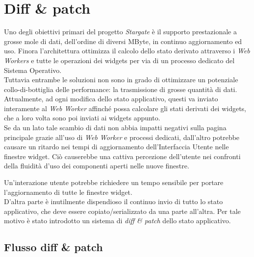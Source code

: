 
\chapter{Diff \& patch}
\label{cap:diff-patch}

Uno degli obiettivi primari del progetto \textit{Stargate} è il supporto prestazionale a grosse mole di dati, dell'ordine di diversi MByte, in continuo aggiornamento ed uso. Finora l'architettura ottimizza il calcolo dello stato derivato attraverso i \textit{Web Workers} e tutte le operazioni dei widgets per via di un processo dedicato del Sistema Operativo. \\

Tuttavia entrambe le soluzioni non sono in grado di ottimizzare un potenziale collo-di-bottiglia delle performance: la trasmissione di grosse quantità di dati. Attualmente, ad ogni modifica dello stato applicativo, questi va inviato interamente al \textit{Web Worker} affinché possa calcolare gli stati derivati dei widgets, che a loro volta sono poi inviati ai widgets appunto. \\

Se da un lato tale scambio di dati non abbia impatti negativi sulla pagina principale grazie all'uso di \textit{Web Worker} e processi dedicati, dall'altro potrebbe causare un ritardo nei tempi di aggiornamento dell'Interfaccia Utente nelle finestre widget. Ciò causerebbe una cattiva percezione dell'utente nei confronti della fluidità d'uso dei componenti aperti nelle nuove finestre.

Un'interazione utente potrebbe richiedere un tempo sensibile per portare l'aggiornamento di tutte le finestre widget. \\

D'altra parte è inutilmente dispendioso il continuo invio di tutto lo stato applicativo, che deve essere copiato/serializzato da una parte all'altra. Per tale motivo è stato introdotto un sistema di \textit{diff \& patch} dello stato applicativo.

\section{Flusso diff \& patch}

